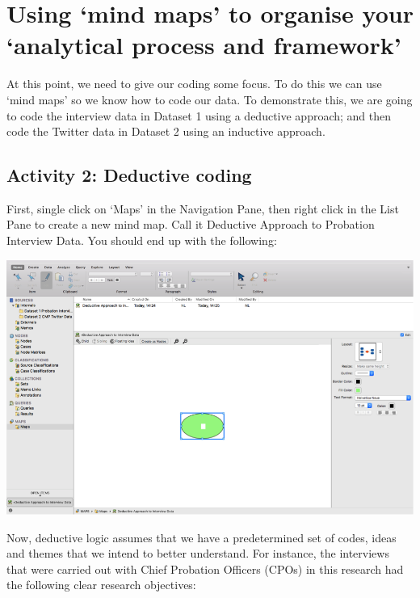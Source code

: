 \documentclass[]{book}
\theoremstyle{definition}
\theoremstyle{definition}
\theoremstyle{definition}
\theoremstyle{remark}
\begin{document}
\hypertarget{using-mind-maps-to-organise-your-analytical-process-and-framework}{%
\section{Using `mind maps' to organise your `analytical process and
framework'}\label{using-mind-maps-to-organise-your-analytical-process-and-framework}}

At this point, we need to give our coding some focus. To do this we can
use `mind maps' so we know how to code our data. To demonstrate this, we
are going to code the interview data in Dataset 1 using a deductive
approach; and then code the Twitter data in Dataset 2 using an inductive
approach.

\hypertarget{activity-2-deductive-coding}{%
\subsection{Activity 2: Deductive
coding}\label{activity-2-deductive-coding}}

First, single click on `Maps' in the Navigation Pane, then right click
in the List Pane to create a new mind map. Call it Deductive Approach to
Probation Interview Data. You should end up with the following:

\includegraphics{imgs/qual_39.png}

Now, deductive logic assumes that we have a predetermined set of codes,
ideas and themes that we intend to better understand. For instance, the
interviews that were carried out with Chief Probation Officers (CPOs) in
this research had the following clear research objectives:
\end{document}
